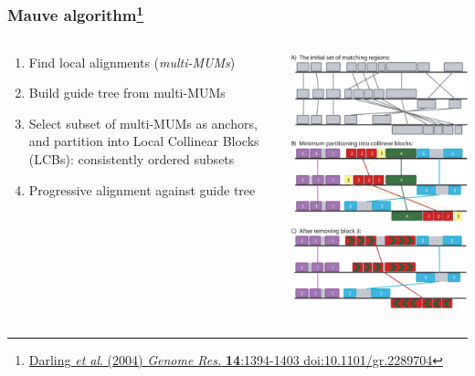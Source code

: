 \begin{frame}
  \frametitle{Mauve algorithm\footnote{\tiny{\href{http://dx.doi.org/10.1101/gr.2289704}{Darling \textit{et al}. (2004) \textit{Genome Res.} \textbf{14}:1394-1403 doi:10.1101/gr.2289704}}}}
  \begin{columns}[T]
    \begin{column}{5cm}
      \begin{enumerate}
        \item Find local alignments (\textit{multi-MUMs})
        \item Build guide tree from multi-MUMs
        \item Select subset of multi-MUMs as anchors, and partition into Local Collinear Blocks (LCBs): consistently ordered subsets
        \item Progressive alignment against guide tree
      \end{enumerate}
    \end{column}
    \begin{column}{5cm}
      \includegraphics[width=1\textwidth]{images/mauve_algorithm}
    \end{column}
  \end{columns}
\end{frame}

